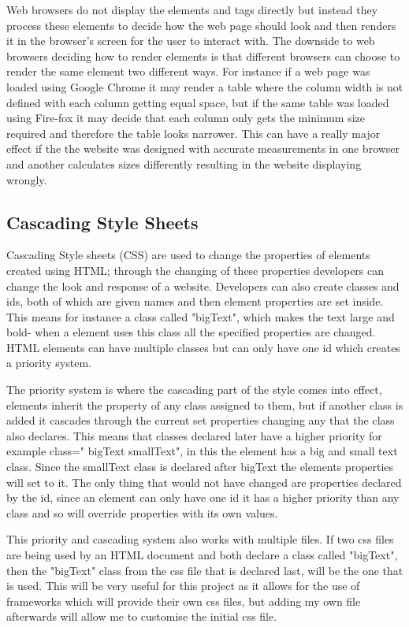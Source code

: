 \documentclass[12pt]{article}  %
\begin{document}
\noindent Web browsers do not display the elements and tags directly \cite{w3_introduction_nodate} but instead they process these elements to decide how the web page should look and then renders it in the browser's screen for the user to interact with. The downside to web browsers deciding how to render elements is that different browsers can choose to render the same element two different ways. For instance if a web page was loaded using Google Chrome it may render a table where the column width is not defined with each column getting equal space, but if the same table was loaded using Fire-fox it may decide that each column only gets the minimum size required and therefore the table looks narrower. This can have a really major effect if the the website was designed with accurate measurements in one browser and another calculates sizes differently resulting in the website displaying wrongly.    


\subsection{Cascading Style Sheets}
Cascading Style sheets (CSS)\cite{lie_cascading_2005} are used to change the properties of elements created using HTML; through the changing of these properties developers can change the look and response of a website. Developers can also create classes and ids, both of which are given names and then element properties are set inside. This means for instance a class called "bigText", which makes the text large and bold- when a element uses this class all the specified properties are changed. HTML elements can have multiple classes but can only have one id which creates a priority system. 

The priority system \cite{noauthor_cascading_nodate} is where the cascading part of the style comes into effect, elements inherit the property of any class assigned to them, but if another class is added it cascades through the current set properties changing any that the class also declares. This means that classes declared later have a higher priority for example class=" bigText smallText", in this the element has a big and small text class. Since the smallText class is declared after bigText the elements properties will set to it. The only thing that would not have changed are properties declared by the id, since an element can only have one id it has a higher priority than any class and so will override properties with its own values.  

This priority and cascading system also works with multiple files. If two css files are being used by an HTML document and both declare a class called "bigText", then the "bigText" class from the css file that is declared last, will be the one that is used. This will be very useful for this project as it allows for the use of frameworks which will provide their own css files, but adding my own file afterwards will allow me to customise the initial css file.
\end{document}
